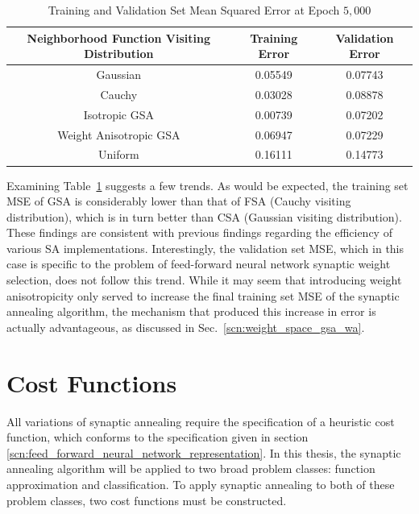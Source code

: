 \documentclass[11pt]{afthesis}
\begin{document}
	\begin{table}[ht]
		\caption{Training and Validation Set Mean Squared Error at Epoch $5,000$} %
		\centering %
		\begin{tabular}{ c || c | c } 

			\hline \hline 
			Neighborhood Function Visiting Distribution & Training Error &  Validation Error \\ [0.5ex] 
			\hline \hline 
			Gaussian & 0.05549 & 0.07743 \\ 
			Cauchy & 0.03028 & 0.08878 \\ 
			Isotropic GSA & 0.00739 & 0.07202 \\ 
			Weight Anisotropic GSA & 0.06947 & 0.07229 \\
			Uniform  & 0.16111 & 0.14773\\ 
			\hline %
		\end{tabular}
		\label{table:weight_space_perf}
	\end{table}

	Examining Table~\ref{table:weight_space_perf} suggests a few trends. As would be expected, the training set MSE of GSA is considerably lower than that of FSA (Cauchy visiting distribution), which is in turn better than CSA (Gaussian visiting distribution). These findings are consistent with previous findings \cite{tsallis1996generalizedsimulatedannealing,dallinga2004performancegsa} regarding the efficiency of various SA implementations. Interestingly, the validation set MSE, which in this case is specific to the problem of feed-forward neural network synaptic weight selection, does not follow this trend. While it may seem that introducing weight anisotropicity only served to increase the final training set MSE of the synaptic annealing algorithm, the mechanism that produced this increase in error is actually advantageous, as discussed in Sec.~\ref{scn:weight_space_gsa_wa}.
	
	
	\section{Cost Functions}
	\label{scn:cost_functions}
	All variations of synaptic annealing require the specification of a heuristic cost function, which conforms to the specification given in section \ref{scn:feed_forward_neural_network_representation}. In this thesis, the synaptic annealing algorithm will be applied to two broad problem classes: function approximation and classification. To apply synaptic annealing to both of these problem classes, two cost functions must be constructed.
	
\end{document}
